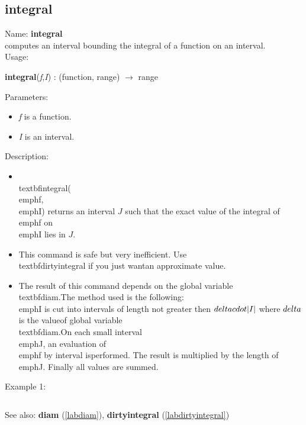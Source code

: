 \subsection{integral}
\label{labintegral}
\noindent Name: \textbf{integral}\\
computes an interval bounding the integral of a function on an interval.\\
\noindent Usage: 
\begin{center}
\textbf{integral}(\emph{f},\emph{I}) : (\textsf{function}, \textsf{range}) $\rightarrow$ \textsf{range}\\
\end{center}
Parameters: 
\begin{itemize}
\item \emph{f} is a function.
\item \emph{I} is an interval.
\end{itemize}
\noindent Description: \begin{itemize}

\item \\textbf{integral}(\\emph{f},\\emph{I}) returns an interval $J$ such that the exact value of \n   the integral of \\emph{f} on \\emph{I} lies in $J$.\n
\item This command is safe but very inefficient. Use \\textbf{dirtyintegral} if you just want\n   an approximate value.\n
\item The result of this command depends on the global variable \\textbf{diam}.\n   The method used is the following: \\emph{I} is cut into intervals of length not \n   greater then $\\delta \\cdot |I|$ where $\\delta$ is the value\n   of global variable \\textbf{diam}.\n   On each small interval \\emph{J}, an evaluation of \\emph{f} by interval is\n   performed. The result is multiplied by the length of \\emph{J}. Finally all values \n   are summed.\n\end{itemize}
\noindent Example 1: 
\begin{center}\begin{minipage}{15cm}\begin{Verbatim}[frame=single]
\end{Verbatim}
\end{minipage}\end{center}
See also: \textbf{diam} (\ref{labdiam}), \textbf{dirtyintegral} (\ref{labdirtyintegral})
